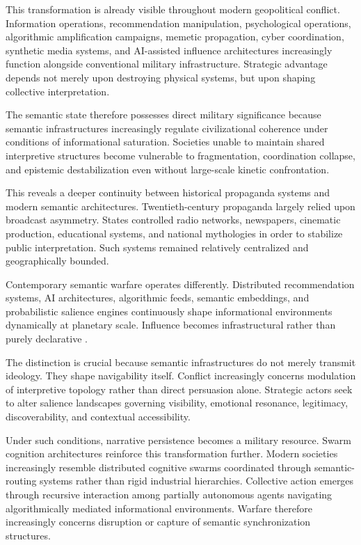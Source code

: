 \documentclass[11pt,a4paper]{article}
\begin{document}
This transformation is already visible throughout modern geopolitical conflict. Information operations, recommendation manipulation, psychological operations, algorithmic amplification campaigns, memetic propagation, cyber coordination, synthetic media systems, and AI-assisted influence architectures increasingly function alongside conventional military infrastructure. Strategic advantage depends not merely upon destroying physical systems, but upon shaping collective interpretation.

The semantic state therefore possesses direct military significance because semantic infrastructures increasingly regulate civilizational coherence under conditions of informational saturation. Societies unable to maintain shared interpretive structures become vulnerable to fragmentation, coordination collapse, and epistemic destabilization even without large-scale kinetic confrontation.

This reveals a deeper continuity between historical propaganda systems and modern semantic architectures. Twentieth-century propaganda largely relied upon broadcast asymmetry. States controlled radio networks, newspapers, cinematic production, educational systems, and national mythologies in order to stabilize public interpretation. Such systems remained relatively centralized and geographically bounded.

Contemporary semantic warfare operates differently. Distributed recommendation systems, AI architectures, algorithmic feeds, semantic embeddings, and probabilistic salience engines continuously shape informational environments dynamically at planetary scale. Influence becomes infrastructural rather than purely declarative \cite{castells1996}.

The distinction is crucial because semantic infrastructures do not merely transmit ideology. They shape navigability itself. Conflict increasingly concerns modulation of interpretive topology rather than direct persuasion alone. Strategic actors seek to alter salience landscapes governing visibility, emotional resonance, legitimacy, discoverability, and contextual accessibility.

Under such conditions, narrative persistence becomes a military resource. Swarm cognition architectures reinforce this transformation further. Modern societies increasingly resemble distributed cognitive swarms coordinated through semantic-routing systems rather than rigid industrial hierarchies. Collective action emerges through recursive interaction among partially autonomous agents navigating algorithmically mediated informational environments. Warfare therefore increasingly concerns disruption or capture of semantic synchronization structures.
\end{document}
